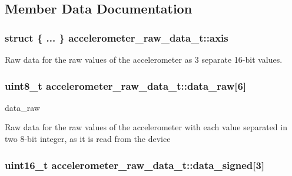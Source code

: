 \subsection{Member Data Documentation}
\subsubsection[{\texorpdfstring{axis}{axis}}]{\setlength{\rightskip}{0pt plus 5cm}struct \{ ... \}   accelerometer\+\_\+raw\+\_\+data\+\_\+t\+::axis}\hypertarget{unionaccelerometer__raw__data__t_adcc370ba6615711ae52eb03e28d85420}{}\label{unionaccelerometer__raw__data__t_adcc370ba6615711ae52eb03e28d85420}


Raw data for the raw values of the accelerometer as 3 separate 16-\/bit values. 

\subsubsection[{\texorpdfstring{data\+\_\+raw}{data_raw}}]{\setlength{\rightskip}{0pt plus 5cm}uint8\+\_\+t accelerometer\+\_\+raw\+\_\+data\+\_\+t\+::data\+\_\+raw\mbox{[}6\mbox{]}}\hypertarget{unionaccelerometer__raw__data__t_a5e7e0fcbf2dbf3ec6a03f1e9c0a926ec}{}\label{unionaccelerometer__raw__data__t_a5e7e0fcbf2dbf3ec6a03f1e9c0a926ec}


data\+\_\+raw 

Raw data for the raw values of the accelerometer with each value separated in two 8-\/bit integer, as it is read from the device 
\subsubsection[{\texorpdfstring{data\+\_\+signed}{data_signed}}]{\setlength{\rightskip}{0pt plus 5cm}uint16\+\_\+t accelerometer\+\_\+raw\+\_\+data\+\_\+t\+::data\+\_\+signed\mbox{[}3\mbox{]}}\hypertarget{unionaccelerometer__raw__data__t_a950284c393c296664512a28ed729cb62}{}\label{unionaccelerometer__raw__data__t_a950284c393c296664512a28ed729cb62}


